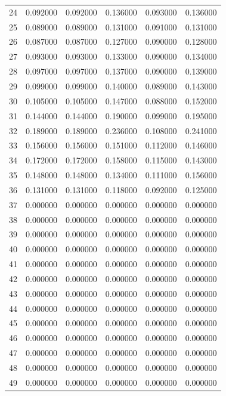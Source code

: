 \begin{tabular}{lrrrrr}
24 & 0.092000 & 0.092000 & 0.136000 & 0.093000 & 0.136000 \\
25 & 0.089000 & 0.089000 & 0.131000 & 0.091000 & 0.131000 \\
26 & 0.087000 & 0.087000 & 0.127000 & 0.090000 & 0.128000 \\
27 & 0.093000 & 0.093000 & 0.133000 & 0.090000 & 0.134000 \\
28 & 0.097000 & 0.097000 & 0.137000 & 0.090000 & 0.139000 \\
29 & 0.099000 & 0.099000 & 0.140000 & 0.089000 & 0.143000 \\
30 & 0.105000 & 0.105000 & 0.147000 & 0.088000 & 0.152000 \\
31 & 0.144000 & 0.144000 & 0.190000 & 0.099000 & 0.195000 \\
32 & 0.189000 & 0.189000 & 0.236000 & 0.108000 & 0.241000 \\
33 & 0.156000 & 0.156000 & 0.151000 & 0.112000 & 0.146000 \\
34 & 0.172000 & 0.172000 & 0.158000 & 0.115000 & 0.143000 \\
35 & 0.148000 & 0.148000 & 0.134000 & 0.111000 & 0.156000 \\
36 & 0.131000 & 0.131000 & 0.118000 & 0.092000 & 0.125000 \\
37 & 0.000000 & 0.000000 & 0.000000 & 0.000000 & 0.000000 \\
38 & 0.000000 & 0.000000 & 0.000000 & 0.000000 & 0.000000 \\
39 & 0.000000 & 0.000000 & 0.000000 & 0.000000 & 0.000000 \\
40 & 0.000000 & 0.000000 & 0.000000 & 0.000000 & 0.000000 \\
41 & 0.000000 & 0.000000 & 0.000000 & 0.000000 & 0.000000 \\
42 & 0.000000 & 0.000000 & 0.000000 & 0.000000 & 0.000000 \\
43 & 0.000000 & 0.000000 & 0.000000 & 0.000000 & 0.000000 \\
44 & 0.000000 & 0.000000 & 0.000000 & 0.000000 & 0.000000 \\
45 & 0.000000 & 0.000000 & 0.000000 & 0.000000 & 0.000000 \\
46 & 0.000000 & 0.000000 & 0.000000 & 0.000000 & 0.000000 \\
47 & 0.000000 & 0.000000 & 0.000000 & 0.000000 & 0.000000 \\
48 & 0.000000 & 0.000000 & 0.000000 & 0.000000 & 0.000000 \\
49 & 0.000000 & 0.000000 & 0.000000 & 0.000000 & 0.000000 \\

\end{tabular}
